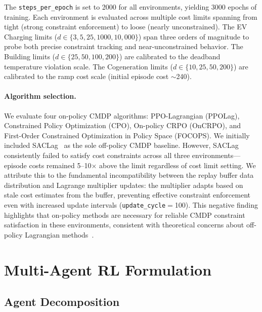 The \texttt{steps\_per\_epoch} is set to 2000 for all environments, yielding 3000 epochs of training. Each environment is evaluated across multiple cost limits spanning from tight (strong constraint enforcement) to loose (nearly unconstrained). The EV Charging limits ($d \in \{3, 5, 25, 1000, 10{,}000\}$) span three orders of magnitude to probe both precise constraint tracking and near-unconstrained behavior. The Building limits ($d \in \{25, 50, 100, 200\}$) are calibrated to the deadband temperature violation scale. The Cogeneration limits ($d \in \{10, 25, 50, 200\}$) are calibrated to the ramp cost scale (initial episode cost $\sim$240).

\paragraph{Algorithm selection.} We evaluate four on-policy CMDP algorithms: PPO-Lagrangian (PPOLag), Constrained Policy Optimization (CPO), On-policy CRPO (OnCRPO), and First-Order Constrained Optimization in Policy Space (FOCOPS). We initially included SACLag~\citep{ha2021learning} as the sole off-policy CMDP baseline. However, SACLag consistently failed to satisfy cost constraints across all three environments---episode costs remained 5--10$\times$ above the limit regardless of cost limit setting. We attribute this to the fundamental incompatibility between the replay buffer data distribution and Lagrange multiplier updates: the multiplier adapts based on stale cost estimates from the buffer, preventing effective constraint enforcement even with increased update intervals (\texttt{update\_cycle}$=$100). This negative finding highlights that on-policy methods are necessary for reliable CMDP constraint satisfaction in these environments, consistent with theoretical concerns about off-policy Lagrangian methods~\citep{ray2019benchmarking_safe}.

\section{Multi-Agent RL Formulation}
\label{sec:marl_formulation}

\subsection{Agent Decomposition}
\label{sec:agent_decomposition}

